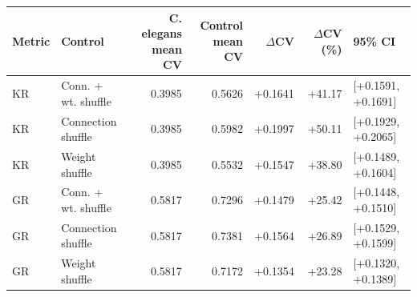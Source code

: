 \begin{tabular}{llrrrrl}
\toprule
Metric & Control & C. elegans mean CV & Control mean CV & $\Delta$CV & $\Delta$CV (\%) & 95\% CI \\
\midrule
KR & Conn. + wt. shuffle & 0.3985 & 0.5626 & +0.1641 & +41.17 & [+0.1591, +0.1691] \\
KR & Connection shuffle & 0.3985 & 0.5982 & +0.1997 & +50.11 & [+0.1929, +0.2065] \\
KR & Weight shuffle & 0.3985 & 0.5532 & +0.1547 & +38.80 & [+0.1489, +0.1604] \\
GR & Conn. + wt. shuffle & 0.5817 & 0.7296 & +0.1479 & +25.42 & [+0.1448, +0.1510] \\
GR & Connection shuffle & 0.5817 & 0.7381 & +0.1564 & +26.89 & [+0.1529, +0.1599] \\
GR & Weight shuffle & 0.5817 & 0.7172 & +0.1354 & +23.28 & [+0.1320, +0.1389] \\
\bottomrule
\end{tabular}
